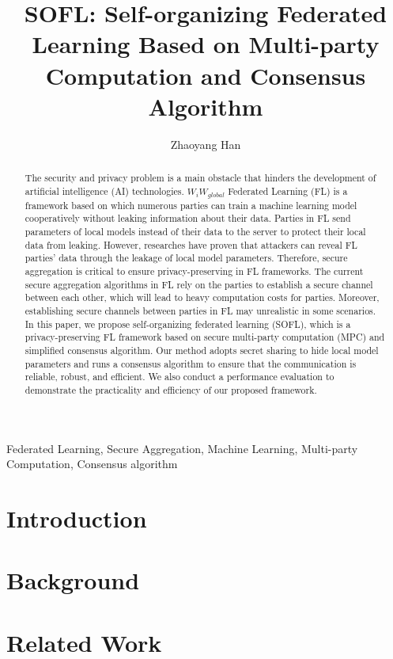 \documentclass[journal]{IEEEtran}
\title {SOFL: Self-organizing Federated Learning Based on Multi-party Computation and Consensus Algorithm}
\author{Zhaoyang Han}
\begin{document}
\maketitle

\begin{abstract}
The security and privacy problem is a main obstacle that hinders the development of artificial intelligence (AI) technologies. $W_i W_{global}$ Federated Learning (FL) is a framework based on which numerous parties can train a machine learning model cooperatively without leaking information about their data. Parties in FL send parameters of local models instead of their data to the server to protect their local data from leaking. However, researches have proven that attackers can reveal FL parties' data through the leakage of local model parameters. Therefore, secure aggregation is critical to ensure privacy-preserving in FL frameworks. The current secure aggregation algorithms in FL rely on the parties to establish a secure channel between each other, which will lead to heavy computation costs for parties. Moreover, establishing secure channels between parties in FL may unrealistic in some scenarios.
In this paper, we propose self-organizing federated learning (SOFL), which is a privacy-preserving FL framework based on secure multi-party computation (MPC) and simplified consensus algorithm. Our method adopts secret sharing to hide local model parameters and runs a consensus algorithm to ensure that the communication is reliable, robust, and efficient.
We also conduct a performance evaluation to demonstrate the practicality and efficiency of our proposed framework. 

\end{abstract}

\begin{IEEEkeywords}
    Federated Learning, Secure Aggregation, Machine Learning, Multi-party Computation, Consensus algorithm
\end{IEEEkeywords}


\section{Introduction} 
\label{sec:intro}


\section{Background}
\label{sec:back}


\section{Related Work}
\label{sec:related}

\end{document}
